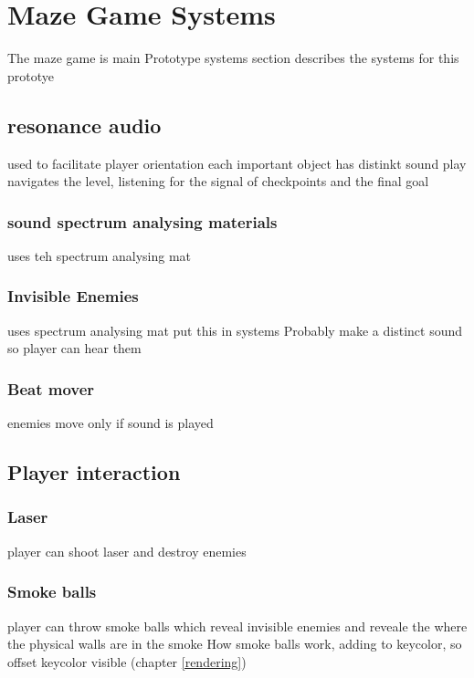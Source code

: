 
\chapter{Maze Game Systems}
The maze game is main Prototype
systems section describes the systems for this prototye

\section{resonance audio}
used to facilitate player orientation
each important object has distinkt sound
play navigates the level, listening for the signal of checkpoints and the final goal



\subsection{sound spectrum analysing materials}
uses teh spectrum analysing mat


\subsection{Invisible Enemies}
uses spectrum analysing mat
put this in systems Probably
make a distinct sound so player can hear them



\subsection{Beat mover}
enemies move only if sound is played



\section{Player interaction}
\subsection{Laser}
player can shoot laser and destroy enemies


\subsection{Smoke balls}
player can throw smoke balls which reveal invisible enemies and reveale the where the physical walls are in the smoke
How smoke balls work, adding to keycolor, so offset keycolor visible (chapter \ref{rendering})

